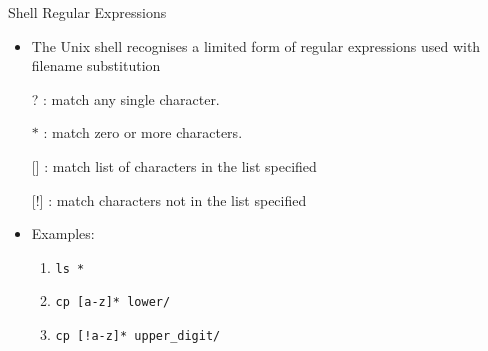 \documentclass[10pt,t]{beamer}
\begin{document}
\begin{frame}[c]{Shell Regular Expressions}
  \begin{itemize}
    \item The Unix shell recognises a limited form of regular expressions used with filename substitution
    \item[?]: match any single character.
    \item[$\ast$]: match zero or more characters.
    \item[{[\quad]}]: match list of characters in the list specified
    \item[{[!\quad]}]: match characters not in the list specified
    \item Examples:
    \begin{enumerate}
      \item \texttt{ls *}
      \item \texttt{cp [a-z]* lower/}
      \item \texttt{cp [!a-z]* upper\_digit/}
    \end{enumerate}
  \end{itemize}
\end{frame}
\end{document}
